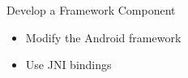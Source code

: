 \setuplabframe
{Develop a Framework Component}
{
  \begin{itemize}
  \item Modify the Android framework
  \item Use JNI bindings
  \end{itemize}
}
